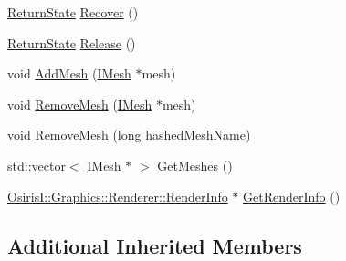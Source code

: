 \begin{DoxyCompactItemize}
\item 
\hyperlink{namespace_osiris_i_a8f53bf938dc75c65c6a529694514013e}{Return\-State} \hyperlink{class_osiris_i_1_1_graphics_1_1_actors_1_1_d_x11_game_model_a8ae3032cd7d3e9bbfce8a7577746a6a0}{Recover} ()
\item 
\hyperlink{namespace_osiris_i_a8f53bf938dc75c65c6a529694514013e}{Return\-State} \hyperlink{class_osiris_i_1_1_graphics_1_1_actors_1_1_d_x11_game_model_a121a6c3f001921f9c536536a9300c128}{Release} ()
\item 
void \hyperlink{class_osiris_i_1_1_graphics_1_1_actors_1_1_d_x11_game_model_a542c3acc2bf48d34b4a0260db7a32c05}{Add\-Mesh} (\hyperlink{class_osiris_i_1_1_graphics_1_1_actors_1_1_i_mesh}{I\-Mesh} $\ast$mesh)
\item 
void \hyperlink{class_osiris_i_1_1_graphics_1_1_actors_1_1_d_x11_game_model_a16fcbae59e9f7ec9a19cec6c77918b76}{Remove\-Mesh} (\hyperlink{class_osiris_i_1_1_graphics_1_1_actors_1_1_i_mesh}{I\-Mesh} $\ast$mesh)
\item 
void \hyperlink{class_osiris_i_1_1_graphics_1_1_actors_1_1_d_x11_game_model_ac9021c8e83c625aee99b498a280542f4}{Remove\-Mesh} (long hashed\-Mesh\-Name)
\item 
std\-::vector$<$ \hyperlink{class_osiris_i_1_1_graphics_1_1_actors_1_1_i_mesh}{I\-Mesh} $\ast$ $>$ \hyperlink{class_osiris_i_1_1_graphics_1_1_actors_1_1_d_x11_game_model_a54c63867a806d878522b2560de0fd864}{Get\-Meshes} ()
\item 
\hyperlink{struct_osiris_i_1_1_graphics_1_1_renderer_1_1_render_info}{Osiris\-I\-::\-Graphics\-::\-Renderer\-::\-Render\-Info} $\ast$ \hyperlink{class_osiris_i_1_1_graphics_1_1_actors_1_1_d_x11_game_model_a7f4900c522aa235876411c34c0d51740}{Get\-Render\-Info} ()
\end{DoxyCompactItemize}
\subsection*{Additional Inherited Members}


